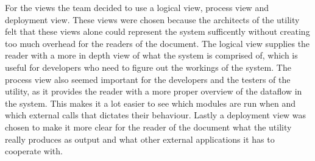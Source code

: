 For the views the team decided to use a logical view, process view and deployment view. These views were chosen because the architects of the utility felt that these views alone could represent the system sufficently without creating too much overhead for the readers of the document. The logical view supplies the reader with a more in depth view of what the system is comprised of, which is useful for developers who need to figure out the workings of the system. The process view also seemed important for the developers and the testers of the utility, as it provides the reader with a more proper overview of the dataflow in the system. This makes it a lot easier to see which modules are run when and which external calls that dictates their behaviour. Lastly a deployment view was chosen to make it more clear for the reader of the document what the utility really produces as output and what other external applications it has to cooperate with. 

